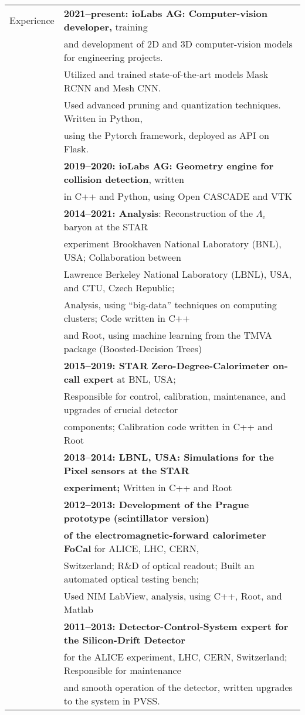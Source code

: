 \documentclass[a4paper,11pt,oneside]{article}
\begin{document}
\begin{tabular}{@{} l l}
  \Large{Experience} & \textbf{2021--present: ioLabs AG: Computer-vision developer,} training\\
     & and development of 2D and 3D computer-vision models for engineering projects. \\
     & Utilized and trained state-of-the-art models Mask RCNN and Mesh CNN\@. \\ 
     & Used advanced pruning and quantization techniques. Written in Python, \\
     & using the Pytorch framework, deployed as API on Flask.\\[.3cm]
     & \textbf{2019--2020: ioLabs AG: Geometry engine for collision detection}, written\\
     &  in C++ and Python, using Open CASCADE and VTK\\[.3cm]
     & \textbf{2014--2021: Analysis}: Reconstruction of the $\Lambda_\mathrm{c}$ baryon  at the STAR \\
     & experiment Brookhaven National Laboratory (BNL), USA; Collaboration between \\
     &  Lawrence Berkeley National Laboratory (LBNL), USA, and CTU, Czech Republic;\\
     & Analysis, using ``big-data'' techniques on computing clusters; Code written in C++ \\
     & and Root, using machine learning from the TMVA package (Boosted-Decision Trees)\\[.3cm]
     & \textbf{2015--2019: STAR Zero-Degree-Calorimeter on-call expert} at BNL, USA; \\ 
     &  Responsible for control, calibration, maintenance, and upgrades of crucial detector \\
     & components; Calibration code written in C++ and Root \\[.3cm]
     & \textbf{2013--2014: LBNL, USA\@: Simulations for the Pixel sensors at the STAR } \\ 
     & \textbf{experiment;} Written in C++ and Root\\[.3cm]
     & \textbf{2012--2013: Development of the Prague prototype (scintillator version)} \\ 
     & \textbf{of the electromagnetic-forward calorimeter FoCal} for ALICE, LHC, CERN, \\
     & Switzerland; R\&D of optical readout; Built an automated optical testing bench; \\
     & Used NIM LabView, analysis, using C++, Root, and Matlab\\[.3cm]
     & \textbf{2011--2013: Detector-Control-System expert for the Silicon-Drift Detector} \\
     & for the ALICE experiment, LHC, CERN, Switzerland; Responsible for maintenance \\
     & and smooth operation of the detector, written upgrades to the system in PVSS. \\
    

\end{tabular}
\end{document}
